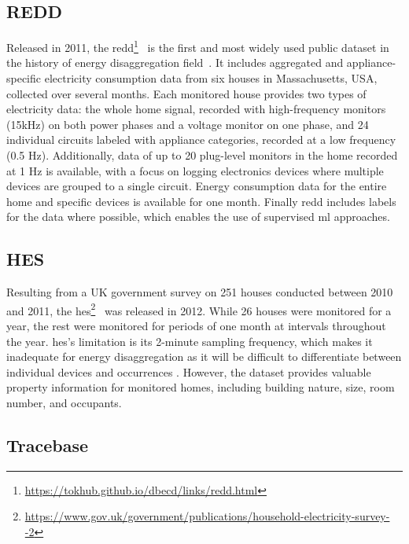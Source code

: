 \subsection{REDD}

Released in 2011, the \acrlong{redd}\footnote{\url{https://tokhub.github.io/dbecd/links/redd.html}}~\parencite{kolter_redd_2011} is the first and most widely used public dataset in the history of energy disaggregation field~\parencite{iqbal_critical_2020}. It includes aggregated and appliance-specific electricity consumption data from six houses in Massachusetts, USA, collected over several months. Each monitored house provides two types of electricity data: the whole home signal, recorded with high-frequency monitors (15kHz) on both power phases and a voltage monitor on one phase, and 24 individual circuits labeled with appliance categories, recorded at a low frequency (0.5 Hz). Additionally, data of up to 20 plug-level monitors in the home recorded at 1 Hz is available, with a focus on logging electronics devices where multiple devices are grouped to a single circuit. Energy consumption data for the entire home and specific devices is available for one month. Finally \acrshort{redd} includes labels for the data where possible, which enables the use of supervised \acrshort{ml} approaches.

\subsection{HES}

Resulting from a UK government survey on 251 houses conducted between 2010 and 2011, the \acrlong{hes}\footnote{\url{https://www.gov.uk/government/publications/household-electricity-survey--2}}~\parencite{zimmermann_household_2012} was released in 2012. While 26 houses were monitored for a year, the rest were monitored for periods of one month at intervals throughout the year. \acrshort{hes}'s limitation is its 2-minute sampling frequency, which makes it inadequate for energy disaggregation as it will be difficult to differentiate between individual devices and occurrences \parencite{himeur_building_2020}. However, the dataset provides valuable property information for monitored homes, including building nature, size, room number, and occupants.

\subsection{Tracebase}

